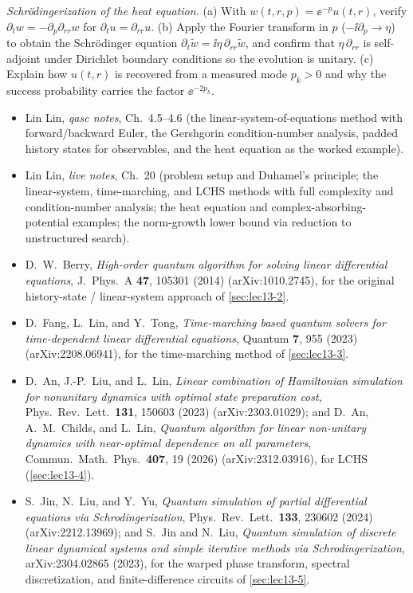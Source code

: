 \begin{exercise}\label{ex:lec13-7}
\emph{Schr\"odingerization of the heat equation.} (a) With $w(t,r,p)=\ee^{-p}u(t,r)$, verify
$\partial_t w=-\partial_p\partial_{rr}w$ for $\partial_t u=\partial_{rr}u$. (b) Apply the Fourier
transform in $p$ ($-\ii\partial_p\to\eta$) to obtain the Schr\"odinger equation
$\partial_t\tilde w=\ii\eta\,\partial_{rr}\tilde w$, and confirm that $\eta\,\partial_{rr}$ is
self-adjoint under Dirichlet boundary conditions so the evolution is unitary. (c) Explain how
$u(t,r)$ is recovered from a measured mode $p_k>0$ and why the success probability carries the
factor $\ee^{-2p_k}$.
\end{exercise}

\readingsection
\begin{itemize}[leftmargin=1.4em]
  \item Lin Lin, \emph{qasc notes}, Ch.~4.5--4.6 (the linear-system-of-equations method with
        forward/backward Euler, the Gershgorin condition-number analysis, padded history states
        for observables, and the heat equation as the worked example).
  \item Lin Lin, \emph{live notes}, Ch.~20 (problem setup and Duhamel's principle; the
        linear-system, time-marching, and LCHS methods with full complexity and
        condition-number analysis; the heat equation and complex-absorbing-potential examples;
        the norm-growth lower bound via reduction to unstructured search).
  \item D.~W.~Berry, \emph{High-order quantum algorithm for solving linear differential
        equations}, J.\ Phys.\ A \textbf{47}, 105301 (2014) (arXiv:1010.2745), for the original
        history-state / linear-system approach of \cref{sec:lec13-2}.
  \item D.~Fang, L.~Lin, and Y.~Tong, \emph{Time-marching based quantum solvers for
        time-dependent linear differential equations}, Quantum \textbf{7}, 955 (2023)
        (arXiv:2208.06941), for the time-marching method of \cref{sec:lec13-3}.
  \item D.~An, J.-P.~Liu, and L.~Lin, \emph{Linear combination of Hamiltonian simulation for
        nonunitary dynamics with optimal state preparation cost}, Phys.\ Rev.\ Lett.\
        \textbf{131}, 150603 (2023) (arXiv:2303.01029); and D.~An, A.~M.~Childs, and L.~Lin,
        \emph{Quantum algorithm for linear non-unitary dynamics with near-optimal dependence on
        all parameters}, Commun.\ Math.\ Phys.\ \textbf{407}, 19 (2026) (arXiv:2312.03916),
        for LCHS (\cref{sec:lec13-4}).
  \item S.~Jin, N.~Liu, and Y.~Yu, \emph{Quantum simulation of partial differential equations
        via Schrodingerization}, Phys.\ Rev.\ Lett.\ \textbf{133}, 230602 (2024)
        (arXiv:2212.13969); and S.~Jin and N.~Liu, \emph{Quantum simulation of discrete linear
        dynamical systems and simple iterative methods via Schrodingerization}, arXiv:2304.02865
        (2023), for the warped phase transform, spectral discretization, and finite-difference
        circuits of \cref{sec:lec13-5}.
\end{itemize}
